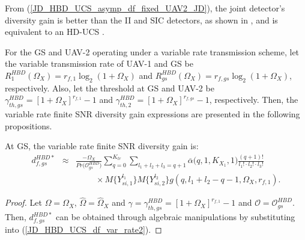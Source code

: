 From (\ref{JD_HBD_UCS_asymp_df_fixed_UAV2_JD}), the joint detector's diversity gain is better than the II and SIC detectors, as shown in \cite[eq. (28)]{ernest2019outage}, and is equivalent to an HD-UCS \cite[eq. (31)]{ernest2019outage}.

For the GS and UAV-2 operating under a variable rate transmission scheme, let the variable transmission rate of UAV-1 and GS be $R_1^{HBD}(\Omega_X)=r_{f,1}\log_2(1+\Omega_X)$ and $R_{gs}^{HBD}(\Omega_X)=r_{f,gs}\log_2(1+\Omega_X)$, respectively. Also, let the threshold at GS and UAV-2 be $\gamma_{th,gs}^{HBD} = [1+\Omega_X]^{r_{f,1}}-1$ and $\gamma_{th,2}^{HBD} = [1+\Omega_X]^{r_{f,gs}}-1$, respectively. Then, the variable rate finite SNR diversity gain expressions are presented in the following propositions.
\begin{proposition}
At GS, the variable rate finite SNR diversity gain is:
\begin{eqnarray} \label{JD_HBD_UCS_df_var_gs}
d_{f,gs}^{HBD*} & \approx & \frac{-\Omega_X}{Pr\big(\mathcal{O}_{gs}^{HBD}\big)} \sum_{q=0}^{K_{tr}}\sum_{l_1+l_2+l_3=q+1} \overline{\alpha}\big(q,1,K_{X_1},1\big) \frac{(q+1)!}{l_1! \cdot l_2! \cdot l_3!} \nonumber\\
& & \hspace{1cm} \times M\{Y_{si,1}^{l_1}\} M\{Y_{si,2}^{l_2}\} g(q,l_1+l_2-q-1,\Omega_X,r_{f,1}).
\end{eqnarray}
\end{proposition}
\begin{proof}
Let $\Omega=\Omega_X$, $\widehat{\Omega}=\widehat{\Omega}_X$ and $\gamma = \gamma_{th,gs}^{HBD}=[1+\Omega_X]^{r_{f,1}}-1$ and $\mathcal{O} = \mathcal{O}_{gs}^{HBD}$. Then, $d_{f,gs}^{HBD*}$ can be obtained through algebraic manipulations by substituting \cite[eq. (6)]{ernest2019outage} into (\ref{JD_HBD_UCS_df_var_rate2}).
\end{proof}

